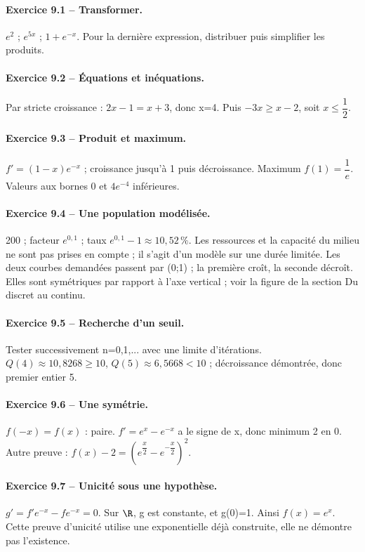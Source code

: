 \paragraph{Exercice 9.1 -- Transformer.} $e^2$ ; $e^{5x}$ ; $1+e^{-x}$. Pour la dernière expression, distribuer puis simplifier les produits.
\paragraph{Exercice 9.2 -- Équations et inéquations.} Par stricte croissance : $2x-1=x+3$, donc x=4. Puis $-3x\geq x-2$, soit $x\leq \dfrac{1}{2}$.
\paragraph{Exercice 9.3 -- Produit et maximum.} $f\prime=(1-x)e^{-x}$ ; croissance jusqu’à 1 puis décroissance. Maximum $f(1)=\dfrac{1}{e}$. Valeurs aux bornes 0 et $4e^{-4}$ inférieures.
\paragraph{Exercice 9.4 -- Une population modélisée.} 200 ; facteur $e^{0{,}1}$ ; taux $e^{0{,}1}-1\approx10{,}52\,\%$. Les ressources et la capacité du milieu ne sont pas prises en compte ; il s’agit d’un modèle sur une durée limitée. Les deux courbes demandées passent par (0;1) ; la première croît, la seconde décroît. Elles sont symétriques par rapport à l’axe vertical ; voir la figure de la section Du discret au continu.
\paragraph{Exercice 9.5 -- Recherche d’un seuil.} Tester successivement n=0,1,... avec une limite d’itérations. $Q(4)\approx10{,}8268\geq10$, $Q(5)\approx6{,}5668<10$ ; décroissance démontrée, donc premier entier 5.
\paragraph{Exercice 9.6 -- Une symétrie.} $f(-x)=f(x)$ : paire. $f\prime=e^x-e^{-x}$ a le signe de x, donc minimum 2 en 0. Autre preuve : $f(x)-2=(e^{\dfrac{x}{2}}-e^{-\dfrac{x}{2}})^2$.
\paragraph{Exercice 9.7 -- Unicité sous une hypothèse.} $g\prime=f\prime e^{-x}-fe^{-x}=0$. Sur $\R$, g est constante, et g(0)=1. Ainsi $f(x)=e^x$. Cette preuve d’unicité utilise une exponentielle déjà construite, elle ne démontre pas l’existence.
